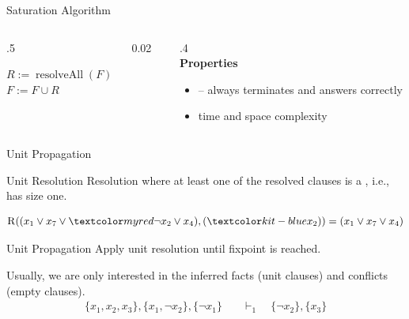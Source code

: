 \documentclass[t]{sdqbeamer}
\begin{document}
\begin{frame}{Saturation Algorithm}
	\centering
	\begin{minipage}{0.95\textwidth}
		\begin{columns}[T]
			\begin{column}{.5\textwidth}
				\begin{algorithm*}[H]
					\DontPrintSemicolon
					\caption{Saturation Algorithm}
					\BlankLine
					 {
						$R := \operatorname{resolveAll}(F)$ \\
						 {
							$F := F \cup R$
						} 
					}
					 {
						\Return {}
					} 
				\end{algorithm*}
			\end{column}%
			\begin{column}{0.02\textwidth}
				\ 
			\end{column}%
			\begin{column}{.4\textwidth}
				\pause
				~\\
				\textbf{Properties}
				\begin{itemize}
					\item {} -- always terminates and answers correctly
					\item \highlo{exponential} time and space complexity
				\end{itemize}
			\end{column}
		\end{columns}
	\end{minipage}
\end{frame}

\begin{frame}{Unit Propagation}
	\begin{block}{Unit Resolution}
		Resolution where at least one of the resolved clauses is a , i.e., has size one.
	\end{block}
	\begin{example}
		\vspace*{-3ex}
		\begin{align*}
			\operatorname{R}((x_1 \vee x_7 \vee \highlo{\lnot {x_2}} \vee x_4), (\highl{x_2})) = (x_1 \vee x_7 \vee x_4)
		\end{align*}
	\end{example}
	\pause
	\begin{block}{Unit Propagation}
		Apply unit resolution until fixpoint is reached.
	\end{block}
	\begin{example}
		Usually, we are only interested in the inferred facts (unit clauses) and conflicts (empty clauses).
		\vspace*{-1ex}
		\begin{align*}
			\{ x_1, x_2, x_3 \}, \{ x_1, \lnot x_2 \}, \{ \lnot x_1 \} \quad &\vdash_1 \quad \{ \lnot x_2 \}, \{ x_3 \}
		\end{align*}
	\end{example}
\end{frame}
\end{document}
